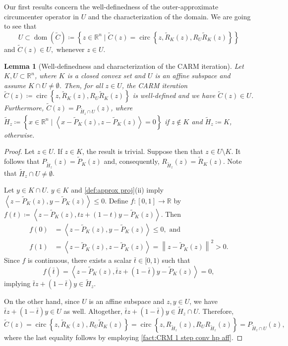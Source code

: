 \documentclass[smallextended,numbook,nospthms]{svjour3}
\theoremstyle{plain}
\newtheorem{lemma}[theorem]{Lemma}
\theoremstyle{definition}
\def\RR{\mathds R}
\newcommand{\scal}[2]{\left\langle{#1},{#2}  \right\rangle}
\DeclareMathOperator{\circum}{circ}
\begin{document}
Our first results concern the well-definedness of the outer-approximate circumcenter operator in $U$ and the characterization of the domain. We are going to see that \[U \subset \operatorname{dom}(\tilde{C})\coloneqq \left\{z \in \RR^{n} \mid \tilde{C}(z)=\circum \left\{z, \tilde{R}_{K}(z), R_{U}\tilde{R}_{K}(z)\right\}\right\}\] and $\tilde{C}(z) \in U,$ whenever $z \in U$.

\begin{lemma}[Well-definedness and characterization of the CARM iteration] \label{lem:CARM well-def char} 
	Let $K, U \subset \RR^{n}$, where $K$ is a closed convex set and $U$ is an affine subspace and assume $K \cap U \not = \emptyset$. Then, for all $z \in U$, the CARM iteration $\tilde{C}(z)\coloneqq \circum\left\{z, \tilde{R}_{K}(z), R_{U}\tilde{R}_{K}(z)\right\}$ is well-defined and we have $\tilde{C}(z) \in U$. Furthermore, $\tilde{C}(z)=P_{\tilde{H}_{z} \cap U}(z)$,
	where $\tilde{H}_{z}\coloneqq \left\{x \in \RR^{n} \mid \scal{x-\tilde{P}_{K}(z)}{z-\tilde{P}_{K}(z)}=0\right\}$ if $z \notin K$ and $\tilde{H}_{z}\coloneqq K$, otherwise.
\end{lemma}
	\begin{proof}

	Let $z \in U$.
	If $z \in K$, the result is trivial. Suppose then that $z \in U \setminus K$. It follows that $P_{\tilde{H}_{z}}(z)=\tilde{P}_{K}(z)$ and, consequently, $R_{\tilde{H}_{z}}(z)=\tilde{R}_{K}(z)$.
	Note that $\tilde{H}_{z} \cap U \neq \emptyset$.
	
	Let $y \in K \cap U$.
	$y \in K$ and \cref{def:approx proj}(ii) imply $\scal{z-\tilde{P}_{K}(z)}{y-\tilde{P}_{K}(z)} \leq 0$.
	Define $f:[0,1] \rightarrow \RR$ by $f(t)\coloneqq \scal{z-\tilde{P}_{K}(z)}{tz+(1-t) y-\tilde{P}_{K}(z)}$.
	Then 
	\begin{align}
			f(0)&=\scal{z-\tilde{P}_{K}(z)}{y-\tilde{P}_{K}(z)} \leq 0, \text{ and}\\
			f(1)&=\scal{z-\tilde{P}_{K}(z)}{z-\tilde{P}_{K}(z)}=\left\|z-\tilde{P}_{K}(z)\right\|^{2}>0.
	\end{align}
	Since $f$ is continuous, there exists a scalar $\bar{t} \in[0,1)$ such that
	\[
	f(\bar{t})=\scal{z-\tilde{P}_{K}(z)}{\bar{t} z+(1-\bar{t}) y-\tilde{P}_{K}(z)}=0,
	\]
	implying $\bar{t} z+(1-\bar{t}) y \in \tilde{H}_{z}$.
	
	On the other hand, since $U$ is an affine subspace and $z, y \in U$, we have $\bar{t}z+(1-\bar{t})y \in U$ as well.
	Altogether, $\bar{t} z+(1-\bar{t}) y \in \tilde{H}_{z} \cap U$.
	Therefore, \[\tilde{C}(z)=\circum\left\{z, \tilde{R}_{K}(z), R_{U}\tilde{R}_{K}(z)\right\}=\circum\left\{z, R_{\tilde{H}_{z}}(z), R_{U}R_{\tilde{H}_{z}}(z)\right\}=P_{\tilde{H}_{z} \cap U}(z),\] where
	the last equality follows by employing  \cref{fact:CRM 1 step conv hp aff}.
\end{proof}
\end{document}
